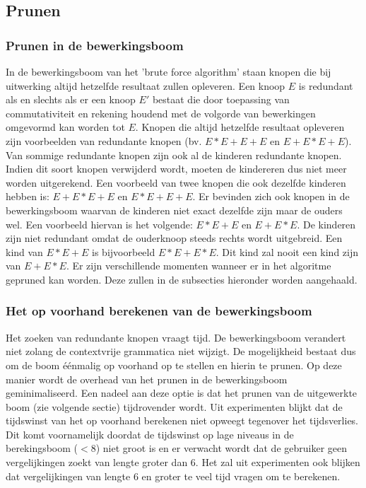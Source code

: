 \documentclass[Main.tex]{subfiles}
\begin{document}
\subsection{Prunen} \label{ssec:Prunen}
\subsubsection*{Prunen in de bewerkingsboom}
In de bewerkingsboom van het 'brute force algorithm' staan knopen die bij uitwerking altijd hetzelfde resultaat zullen opleveren. Een knoop $E$ is redundant als en slechts als er een knoop $E'$ bestaat die door toepassing van commutativiteit en rekening houdend met de volgorde van bewerkingen omgevormd kan worden tot $E$. Knopen die altijd hetzelfde resultaat opleveren zijn voorbeelden van redundante knopen (bv.  $E \ast E+E+E$ en $E+E \ast E +E$). Van sommige redundante knopen zijn ook al de kinderen redundante knopen. Indien dit soort knopen verwijderd wordt, moeten de kindereren dus niet meer worden uitgerekend. Een voorbeeld van twee knopen die ook dezelfde kinderen hebben is: $E+E \ast E+E$ en $E \ast E+E+E$. Er bevinden zich ook knopen in de bewerkingsboom waarvan de kinderen niet exact dezelfde zijn maar de ouders wel. Een voorbeeld hiervan is het volgende: $E \ast E+E$ en $E+E \ast E$. De kinderen zijn niet redundant omdat de ouderknoop steeds rechts wordt uitgebreid. Een kind van $E \ast E+E$ is bijvoorbeeld $E \ast E+E \ast E$. Dit kind zal nooit een kind zijn van $E+E \ast E$. Er zijn verschillende momenten wanneer er in het algoritme gepruned kan worden. Deze zullen in de subsecties hieronder worden aangehaald.

\subsubsection*{Het op voorhand berekenen van de bewerkingsboom}
Het zoeken van redundante knopen vraagt tijd. De bewerkingsboom verandert niet zolang de contextvrije grammatica niet wijzigt. De mogelijkheid bestaat dus om de boom \'e\'enmalig op voorhand op te stellen en hierin te prunen. Op deze manier wordt de overhead van het prunen in de bewerkingsboom geminimaliseerd. Een nadeel aan deze optie is dat het prunen van de uitgewerkte boom (zie volgende sectie) tijdrovender wordt. Uit experimenten blijkt dat de tijdswinst van het op voorhand berekenen niet opweegt tegenover het tijdsverlies. Dit komt voornamelijk doordat de tijdswinst op lage niveaus in de berekingsboom ($< 8$) niet groot is en er verwacht wordt dat de gebruiker geen vergelijkingen zoekt van lengte groter dan 6. Het zal uit experimenten ook blijken dat vergelijkingen van lengte 6 en groter te veel tijd vragen om te berekenen. 
\end{document}
